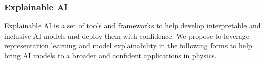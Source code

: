     






\subsubsection{Explainable AI}
Explainable AI is a set of tools and frameworks to help develop interpretable and inclusive AI models and deploy them with confidence. We propose to leverage representation learning and model explainability in the following forms to help bring AI models to a broader and confident applications in physics.

